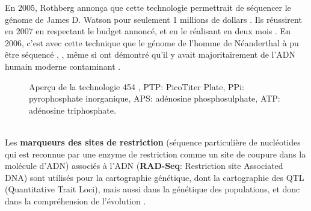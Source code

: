 \documentclass[a4paper,11pt,twoside]{report}
\begin{document}
En 2005, Rothberg annonça que cette technologie permettrait de séquencer le génome de James D. Watson pour seulement 1 millions de dollars \citep{Margulies2005aa} \citep{sengenes2012developpement}.
Ils réussirent en 2007 en respectant le budget annoncé, et en le réalisant en deux mois \citep{wheeler2008complete}. En 2006, c'est avec cette technique que le génome de l'homme de Néanderthal à pu être séquencé \citep{green2006analysis}, \citep{noonan2006sequencing}, même si \citep{Wall2007aa} ont démontré qu'il y avait majoritairement de l'ADN humain moderne contaminant \citep{sengenes2012developpement}.

\begin{figure}[!ht]
\caption{Aperçu de la technologie 454 \citep{sengenes2012developpement}, PTP: PicoTiter Plate, PPi: pyrophosphate inorganique, APS: adénosine phosphosulphate, ATP: adénosine triphosphate.\label{1}}
\end{figure}

~~\\

Les \textbf{marqueurs des sites de restriction} (séquence particulière de nucléotides qui est reconnue par une enzyme de restriction comme un site de coupure dans la molécule d'ADN) associés à l'ADN (\textbf{RAD-Seq}: Restriction site Associated DNA) sont utilisés pour la cartographie génétique, dont la cartographie des QTL (Quantitative Trait Loci), mais aussi dans la génétique des populations, et donc dans la compréhension de l'évolution \citep{davey2010radseq}. 
\end{document}
